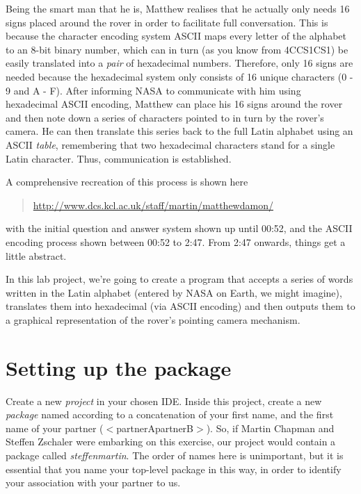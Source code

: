 \documentclass[11pt]{article}
\begin{document}
Being the smart man that he is, Matthew realises that he actually only needs 16 signs placed around the rover in order to facilitate full conversation. This is because the character encoding system ASCII maps every letter of the alphabet to an 8-bit binary number, which can in turn (as you know from 4CCS1CS1) be easily translated into a \emph{pair} of hexadecimal numbers. Therefore, only 16 signs are needed because the hexadecimal system only consists of 16 unique characters (0 - 9 and A - F). After informing NASA to communicate with him using hexadecimal ASCII encoding, Matthew can place his 16 signs around the rover and then note down a series of  characters pointed to in turn by the rover's camera. He can then translate this series back to the full Latin alphabet using an ASCII \emph{table}, remembering that two hexadecimal characters stand for a single Latin character. Thus, communication is established.

A comprehensive recreation of this process is shown here

\begin{quote}
\url{http://www.dcs.kcl.ac.uk/staff/martin/matthewdamon/}
\end{quote}

with the initial question and answer system shown up until 00:52, and the ASCII encoding process shown between 00:52 to 2:47. From 2:47 onwards, things get a little abstract.

In this lab project, we're going to create a program that accepts a series of words written in the Latin alphabet (entered by NASA on Earth, we might imagine), translates them into hexadecimal (via ASCII encoding) and then outputs them to a graphical representation of the rover's pointing camera mechanism. 

\section{Setting up the package}

Create a new \emph{project} in your chosen IDE. Inside this project, create a new \emph{package} named according to a concatenation of your first name, and the first name of your partner ($<$partnerApartnerB$>$). So, if Martin Chapman and Steffen Zschaler were embarking on this exercise, our project would contain a package called \emph{steffenmartin}. The order of names here is unimportant, but it is essential that you name your top-level package in this way, in order to identify your association with your partner to us.
\end{document}
